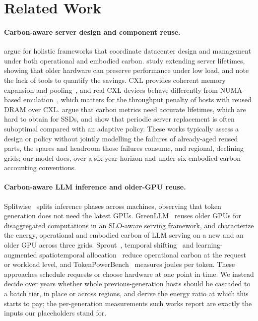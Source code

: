 \documentclass{article} %
\begin{document}
\section{Related Work}
\label{sec:related_work}
\paragraph{Carbon-aware server design and component reuse.}
\citet{Acun2023CarbonDependencies} argue for holistic frameworks that coordinate datacenter design and management under both operational and embodied carbon. \citet{Wang2023PeelingBack} study extending server lifetimes, showing that older hardware can preserve performance under low load, and note the lack of tools to quantify the savings. CXL provides coherent memory expansion and pooling~\citep{Sharma2024IntroductionCompute}, and real CXL devices behave differently from NUMA-based emulation~\citep{Sun2023DemystifyingCxl}, which matters for the throughput penalty of hosts with reused DRAM over CXL. \citet{Huang2025CaseAccurate} argue that carbon metrics need accurate lifetimes, which are hard to obtain for SSDs, and \citet{Sharma2025TowardOptimal} show that periodic server replacement is often suboptimal compared with an adaptive policy. These works typically assess a design or policy without jointly modelling the failures of already-aged reused parts, the spares and headroom those failures consume, and regional, declining grids; our model does, over a six-year horizon and under six embodied-carbon accounting conventions.

\paragraph{Carbon-aware LLM inference and older-GPU reuse.}
Splitwise~\citep{Patel2023SplitwiseEfficient} splits inference phases across machines, observing that token generation does not need the latest GPUs. GreenLLM~\citep{Shi2024GreenllmDisaggregating} reuses older GPUs for disaggregated computations in an SLO-aware serving framework, and \citet{Nguyen2024TowardsSustainable} characterize the energy, operational and embodied carbon of LLM serving on a new and an older GPU across three grids. Sprout~\citep{Li2024SproutGreen}, temporal shifting~\citep{Wiesner2021LetsWait} and learning-augmented spatiotemporal allocation~\citep{Lechowicz2025LearningaugmentedCompetitive} reduce operational carbon at the request or workload level, and TokenPowerBench~\citep{Niu2026TokenpowerbenchBenchmarking} measures joules per token. These approaches schedule requests or choose hardware at one point in time. We instead decide over years whether whole previous-generation hosts should be cascaded to a batch tier, in place or across regions, and derive the energy ratio at which this starts to pay; the per-generation measurements such works report are exactly the inputs our placeholders stand for.
\end{document}
